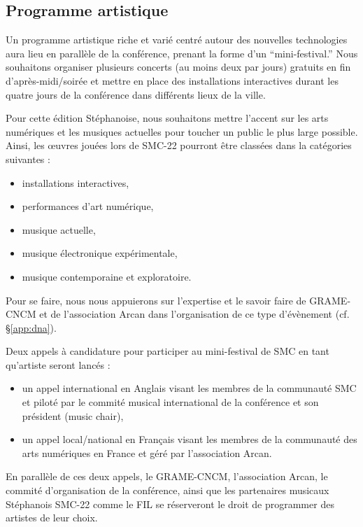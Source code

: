 \documentclass[fontsize=12pt]{scrartcl} %
\numberwithin{equation}{section} %
\numberwithin{figure}{section} %
\numberwithin{table}{section} %
\begin{document}
\subsection{Programme artistique} 

Un programme artistique riche et varié centré autour des nouvelles technologies aura lieu en parallèle de la conférence, prenant la forme d'un ``mini-festival.'' Nous souhaitons organiser plusieurs concerts (au moins deux par jours) gratuits en fin d'après-midi/soirée et mettre en place des installations interactives durant les quatre jours de la conférence dans différents lieux de la ville. 

Pour cette édition Stéphanoise, nous souhaitons mettre l'accent sur les arts numériques et les musiques actuelles pour toucher un public le plus large possible. Ainsi, les œuvres jouées lors de SMC-22 pourront être classées dans la catégories suivantes :

\begin{itemize}
  \item installations interactives,
  \item performances d'art numérique,
  \item musique actuelle,
  \item musique électronique expérimentale,
  \item musique contemporaine et exploratoire. 
\end{itemize} 

Pour se faire, nous nous appuierons sur l'expertise et le savoir faire de GRAME-CNCM et de l'association Arcan dans l'organisation de ce type d'évènement (cf. \S\ref{app:dna}).

Deux appels à candidature pour participer au mini-festival de SMC en tant qu'artiste seront lancés : 

\begin{itemize}
  \item un appel international en Anglais visant les membres de la communauté SMC et piloté par le commité musical international de la conférence et son président (music chair),
  \item un appel local/national en Français visant les membres de la communauté des arts numériques en France et géré par l'association Arcan.
\end{itemize} 

En parallèle de ces deux appels, le GRAME-CNCM, l'association Arcan, le commité d'organisation de la conférence, ainsi que les partenaires musicaux Stéphanois SMC-22 comme le FIL se réserveront le droit de programmer des artistes de leur choix. 
\end{document}
